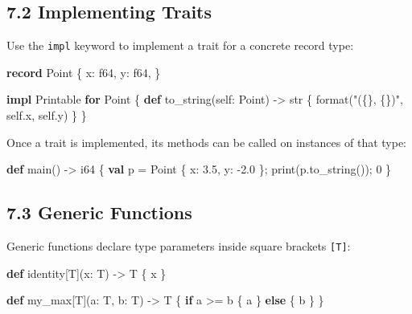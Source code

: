 \documentclass[
  english,
]{book}
\newenvironment{Shaded}{\begin{snugshade}}{\end{snugshade}}
\newcommand{\ControlFlowTok}[1]{\textcolor[rgb]{0.77,0.53,0.75}{\textbf{#1}}}
\newcommand{\DataTypeTok}[1]{\textcolor[rgb]{0.31,0.79,0.69}{#1}}
\newcommand{\DecValTok}[1]{\textcolor[rgb]{0.71,0.81,0.66}{#1}}
\newcommand{\FloatTok}[1]{\textcolor[rgb]{0.71,0.81,0.66}{#1}}
\newcommand{\FunctionTok}[1]{\textcolor[rgb]{0.86,0.86,0.67}{#1}}
\newcommand{\KeywordTok}[1]{\textcolor[rgb]{0.34,0.61,0.84}{\textbf{#1}}}
\newcommand{\NormalTok}[1]{\textcolor[rgb]{0.83,0.83,0.83}{#1}}
\newcommand{\OperatorTok}[1]{\textcolor[rgb]{0.83,0.83,0.83}{#1}}
\newcommand{\StringTok}[1]{\textcolor[rgb]{0.81,0.57,0.47}{#1}}
\begin{document}
\subsection{7.2 Implementing Traits}\label{implementing-traits-1}

Use the \texttt{impl} keyword to implement a trait for a concrete record
type:

\begin{Shaded}
\begin{Highlighting}[]
\KeywordTok{record}\NormalTok{ Point \{}
\NormalTok{    x: }\DataTypeTok{f64}\NormalTok{,}
\NormalTok{    y: }\DataTypeTok{f64}\NormalTok{,}
\NormalTok{\}}

\KeywordTok{impl}\NormalTok{ Printable }\ControlFlowTok{for}\NormalTok{ Point \{}
    \KeywordTok{def}\NormalTok{ to\_string(self: Point) }\OperatorTok{{-}\textgreater{}} \DataTypeTok{str}\NormalTok{ \{}
        \FunctionTok{format}\NormalTok{(}\StringTok{"(\{\}, \{\})"}\NormalTok{, self}\OperatorTok{.}\NormalTok{x, self}\OperatorTok{.}\NormalTok{y)}
\NormalTok{    \}}
\NormalTok{\}}
\end{Highlighting}
\end{Shaded}

Once a trait is implemented, its methods can be called on instances of
that type:

\begin{Shaded}
\begin{Highlighting}[]
\KeywordTok{def}\NormalTok{ main() }\OperatorTok{{-}\textgreater{}} \DataTypeTok{i64}\NormalTok{ \{}
    \KeywordTok{val}\NormalTok{ p }\OperatorTok{=}\NormalTok{ Point \{ x: }\FloatTok{3.5}\NormalTok{, y: }\OperatorTok{{-}}\FloatTok{2.0}\NormalTok{ \};}
    \FunctionTok{print}\NormalTok{(p}\OperatorTok{.}\NormalTok{to\_string());}
    \DecValTok{0}
\NormalTok{\}}
\end{Highlighting}
\end{Shaded}

\subsection{7.3 Generic Functions}\label{generic-functions-1}

Generic functions declare type parameters inside square brackets
\texttt{{[}T{]}}:

\begin{Shaded}
\begin{Highlighting}[]
\KeywordTok{def}\NormalTok{ identity[T](x: T) }\OperatorTok{{-}\textgreater{}}\NormalTok{ T \{}
\NormalTok{    x}
\NormalTok{\}}

\KeywordTok{def}\NormalTok{ my\_max[T](a: T, b: T) }\OperatorTok{{-}\textgreater{}}\NormalTok{ T \{}
    \ControlFlowTok{if}\NormalTok{ a }\OperatorTok{\textgreater{}=}\NormalTok{ b \{ a \} }\ControlFlowTok{else}\NormalTok{ \{ b \}}
\NormalTok{\}}
\end{Highlighting}
\end{Shaded}
\end{document}
